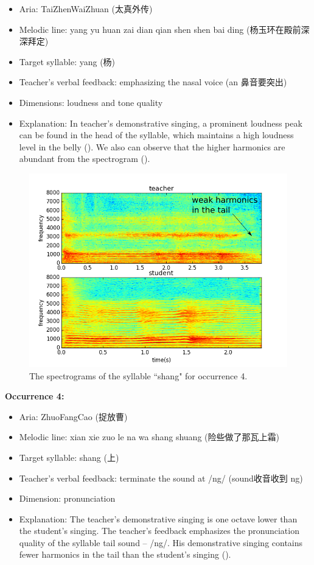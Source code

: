 \begin{itemize}[leftmargin=*, noitemsep]
\item Aria: TaiZhenWaiZhuan (太真外传)
\item Melodic line: yang yu huan zai dian qian shen shen bai ding (杨玉环在殿前深深拜定)
\item Target syllable: yang (杨)
\item Teacher's verbal feedback: emphasizing the nasal voice (an 鼻音要突出)
\item Dimensions: loudness and tone quality
\item Explanation: In teacher's demonstrative singing, a prominent loudness peak can be found in the head of the syllable, which maintains a high loudness level in the belly (). We also can observe that the higher harmonics are abundant from the spectrogram ().
\end{itemize}

\begin{figure}[ht!]
\includegraphics[width=\textwidth]{figs/spectro_vis/ch3_occ4.png}
\caption{The spectrograms of the syllable ``shang" for occurrence 4.}
\label{fig:occurrence_4}
\end{figure}

\noindent\textbf{Occurrence 4:}

\begin{itemize}[leftmargin=*, noitemsep]
\item Aria: ZhuoFangCao (捉放曹)
\item Melodic line: xian xie zuo le na wa shang shuang (险些做了那瓦上霜)
\item Target syllable: shang (上)
\item Teacher's verbal feedback: terminate the sound at /ng/ (sound收音收到 ng)
\item Dimension: pronunciation
\item Explanation: The teacher's demonstrative singing is one octave lower than the student's singing. The teacher's feedback emphasizes the pronunciation quality of the syllable tail sound -- /ng/. His demonstrative singing contains fewer harmonics in the tail than the student's singing ().
\end{itemize}

